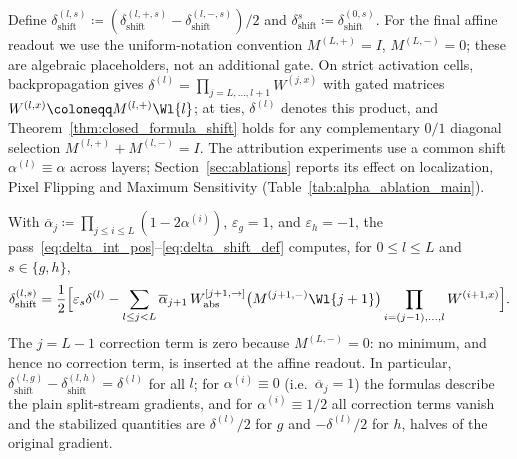 Define $\delta_{\mathrm{shift}}^{(l,s)}\coloneqq(\delta_{\mathrm{shift}}^{(l,+,s)}-\delta_{\mathrm{shift}}^{(l,-,s)})/2$ and $\delta^s_{\mathrm{shift}}\coloneqq\delta_{\mathrm{shift}}^{(0,s)}$. For the final affine readout we use the uniform-notation convention $M^{(L,+)}=I$, $M^{(L,-)}=0$; these are algebraic placeholders, not an additional gate. On strict activation cells, backpropagation gives $\delta^{(l)} = \prod_{j = L, \dots, l+1} W^{(j,x)}$ with gated matrices $W^{(l,x)} \coloneqq M^{(l,+)} \Wl{l}$; at ties, $\delta^{(l)}$ denotes this product, and Theorem~\ref{thm:closed_formula_shift} holds for any complementary $0/1$ diagonal selection $M^{(l,+)}+M^{(l,-)}=I$. The attribution experiments use a common shift $\alpha^{(l)}\equiv\alpha$ across layers; Section~\ref{sec:ablations} reports its effect on localization, Pixel Flipping and Maximum Sensitivity (Table~\ref{tab:alpha_ablation_main}).

\begin{theoremenv}\label{thm:closed_formula_shift}
With $\overline{\alpha}_j\coloneqq\prod_{j\le i\le L}(1-2\alpha^{(i)})$, $\varepsilon_g=1$, and $\varepsilon_h=-1$, the pass~\eqref{eq:delta_int_pos}--\eqref{eq:delta_shift_def} computes, for $0\le l\le L$ and $s\in\{g,h\}$,
\begin{equation}
\delta_{\mathrm{shift}}^{(l,s)}
=\frac12\Bigl[\varepsilon_s\delta^{(l)}-\sum_{l\le j<L}\overline{\alpha}_{j+1}\,W_{\mathrm{abs}}^{[j+1,\rightarrow]}\bigl(M^{(j+1,-)}\Wl{j+1}\bigr)\prod_{i=(j-1),\dots,l}W^{(i+1,x)}\Bigr].
\label{eq:closed_formula_g}
\end{equation}
The $j=L-1$ correction term is zero because $M^{(L,-)}=0$: no minimum, and hence no correction term, is inserted at the affine readout. In particular, $\delta_{\mathrm{shift}}^{(l,g)} - \delta_{\mathrm{shift}}^{(l,h)} = \delta^{(l)}$ for all $l$; for $\alpha^{(i)} \equiv 0$ (i.e.\ $\overline{\alpha}_j = 1$) the formulas describe the plain split-stream gradients, and for $\alpha^{(i)} \equiv 1/2$ all correction terms vanish and the stabilized quantities are $\delta^{(l)}/2$ for $g$ and $-\delta^{(l)}/2$ for $h$, halves of the original gradient.\end{theoremenv}

